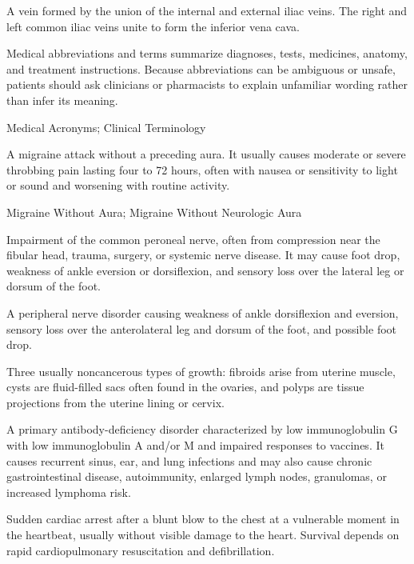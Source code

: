  A vein formed by the union of the internal and external iliac veins. The right and left common iliac veins unite to form the inferior vena cava.

 Medical abbreviations and terms summarize diagnoses, tests, medicines, anatomy, and treatment instructions. Because abbreviations can be ambiguous or unsafe, patients should ask clinicians or pharmacists to explain unfamiliar wording rather than infer its meaning.

\synonyms
Medical Acronyms; Clinical Terminology

 A migraine attack without a preceding aura. It usually causes moderate or severe throbbing pain lasting four to 72 hours, often with nausea or sensitivity to light or sound and worsening with routine activity.

\synonyms
Migraine Without Aura; Migraine Without Neurologic Aura

 Impairment of the common peroneal nerve, often from compression near the fibular head, trauma, surgery, or systemic nerve disease. It may cause foot drop, weakness of ankle eversion or dorsiflexion, and sensory loss over the lateral leg or dorsum of the foot.

 A peripheral nerve disorder causing weakness of ankle dorsiflexion and eversion, sensory
loss over the anterolateral leg and dorsum of the foot, and possible foot drop.

 Three usually noncancerous types of growth: fibroids arise from uterine muscle, cysts are fluid-filled sacs often found in the ovaries, and polyps are tissue projections from the uterine lining or cervix.

 A primary antibody-deficiency disorder characterized by low immunoglobulin G with low immunoglobulin A and/or M and impaired responses to vaccines. It causes recurrent sinus, ear, and lung infections and may also cause chronic gastrointestinal disease, autoimmunity, enlarged lymph nodes, granulomas, or increased lymphoma risk.

 Sudden cardiac arrest after a blunt blow to the chest at a vulnerable moment in the heartbeat, usually without visible damage to the heart. Survival depends on rapid cardiopulmonary resuscitation and defibrillation.

